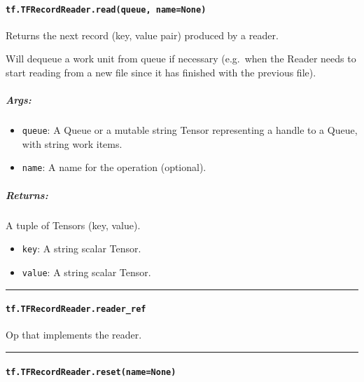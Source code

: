 \paragraph{\texorpdfstring{\texttt{tf.TFRecordReader.read(queue,\ name=None)}
}{tf.TFRecordReader.read(queue, name=None) }}\label{tf.tfrecordreader.readqueue-namenone}

Returns the next record (key, value pair) produced by a reader.

Will dequeue a work unit from queue if necessary (e.g.~when the Reader
needs to start reading from a new file since it has finished with the
previous file).

\subparagraph{Args: }\label{args-32}

\begin{itemize}
\tightlist
\item
  \texttt{queue}: A Queue or a mutable string Tensor representing a
  handle to a Queue, with string work items.
\item
  \texttt{name}: A name for the operation (optional).
\end{itemize}

\subparagraph{Returns: }\label{returns-27}

A tuple of Tensors (key, value).

\begin{itemize}
\tightlist
\item
  \texttt{key}: A string scalar Tensor.
\item
  \texttt{value}: A string scalar Tensor.
\end{itemize}

\begin{center}\rule{0.5\linewidth}{\linethickness}\end{center}

\paragraph{\texorpdfstring{\texttt{tf.TFRecordReader.reader\_ref}
}{tf.TFRecordReader.reader\_ref }}\label{tf.tfrecordreader.readerux5fref}

Op that implements the reader.

\begin{center}\rule{0.5\linewidth}{\linethickness}\end{center}

\paragraph{\texorpdfstring{\texttt{tf.TFRecordReader.reset(name=None)}
}{tf.TFRecordReader.reset(name=None) }}\label{tf.tfrecordreader.resetnamenone}

